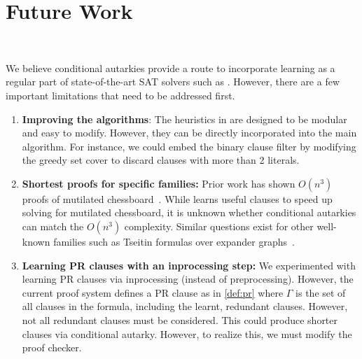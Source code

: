 \section{Future Work}~\label{sec:futurework}


We believe conditional autarkies provide a route to incorporate \pr learning
as a regular part of state-of-the-art SAT solvers such as \cadical. However,
there are a few important limitations that need to be addressed first.

\begin{enumerate}
    \item \textbf{Improving the algorithms}: The heuristics in \tool are
    designed to be modular and easy to modify. However, they can
    be directly incorporated into the main algorithm. For instance, we could embed the
    binary clause filter by modifying the greedy set cover to discard clauses
    with more than 2 literals.
    \item \textbf{Shortest proofs for specific families:} Prior work has shown
    $O(n^3)$ \pr proofs of mutilated chessboard~\cite{mutilatedchessboard-pr}.
    While \tool learns useful clauses to speed up solving for
    mutilated chessboard, it is unknown whether conditional autarkies can match
    the $O(n^3)$ complexity. Similar questions exist for other well-known
    families such as Tseitin formulas over expander
    graphs~\cite{er,hardexamplesresolution}.
    \item \textbf{Learning PR clauses with an inprocessing step:} We
    experimented with learning PR clauses via inprocessing (instead of
    preprocessing). However, the current \pr proof system defines a PR clause
    as in \autoref{def:pr} where $\Gamma$ is the set of all clauses in the
    formula, including the learnt, redundant clauses. However, not all redundant clauses 
    must be considered. This could produce shorter clauses via conditional autarky.
    However, to realize this, we must modify the \pr proof checker.

    
\end{enumerate}